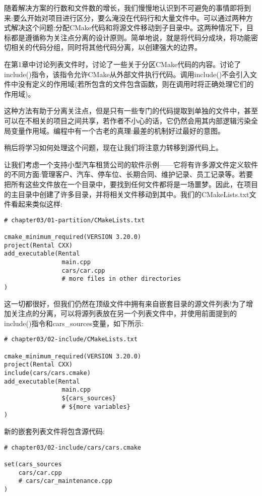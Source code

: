 
随着解决方案的行数和文件数的增长，我们慢慢地认识到不可避免的事情即将到来:要么开始对项目进行区分，要么淹没在代码行和大量文件中。可以通过两种方式解决这个问题:分配CMake代码和将源文件移动到子目录中。这两种情况下，目标都是遵循称为关注点分离的设计原则。简单地说，就是将代码分成块，将功能密切相关的代码分组，同时将其他代码分离，以创建强大的边界。

在第1章中讨论列表文件时，讨论了一些关于分区CMake代码的内容。讨论了include()指令，该指令允许CMake从外部文件执行代码。调用include()不会引入文件中没有定义的作用域(若所包含的文件包含函数，则在调用时将正确处理它们的作用域)。

这种方法有助于分离关注点，但是只有一些专门的代码提取到单独的文件中，甚至可以在不相关的项目之间共享，若作者不小心的话，它仍然会用其内部逻辑污染全局变量作用域。编程中有一个古老的真理:最差的机制好过最好的意图。

稍后将学习如何处理这个问题，现在让我们将注意力转移到源代码上。

让我们考虑一个支持小型汽车租赁公司的软件示例——它将有许多源文件定义软件的不同方面:管理客户、汽车、停车位、长期合同、维护记录、员工记录等。若要把所有这些文件放在一个目录中，要找到任何文件都将是一场噩梦。因此，在项目的主目录中创建了许多目录，并将相关文件移动到其中。我们的CMakeLists.txt文件看起来类似这样:

\begin{lstlisting}[style=styleCMake]
# chapter03/01-partition/CMakeLists.txt

cmake_minimum_required(VERSION 3.20.0)
project(Rental CXX)
add_executable(Rental
				main.cpp
				cars/car.cpp
				# more files in other directories
)
\end{lstlisting}

这一切都很好，但我们仍然在顶级文件中拥有来自嵌套目录的源文件列表!为了增加关注点的分离，可以将源列表放在另一个列表文件中，并使用前面提到的include()指令和cars\_sources变量，如下所示:

\begin{lstlisting}[style=styleCMake]
# chapter03/02-include/CMakeLists.txt

cmake_minimum_required(VERSION 3.20.0)
project(Rental CXX)
include(cars/cars.cmake)
add_executable(Rental
				main.cpp
				${cars_sources}
				# ${more variables}
)
\end{lstlisting}

新的嵌套列表文件将包含源代码:

\begin{lstlisting}[style=styleCMake]
# chapter03/02-include/cars/cars.cmake

set(cars_sources
	cars/car.cpp
	# cars/car_maintenance.cpp
)
\end{lstlisting}

